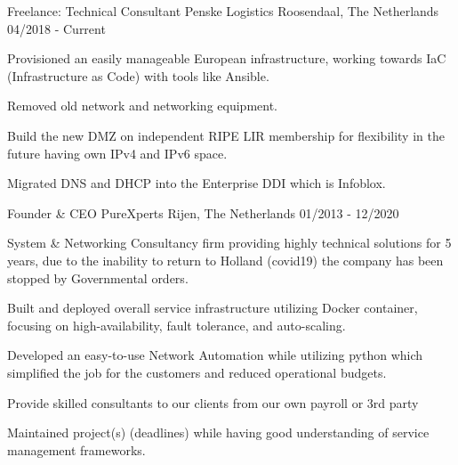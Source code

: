 

\begin{cventries}

\cventry
	{Freelance: Technical Consultant}  %
    {Penske Logistics} %
    {Roosendaal, The Netherlands} %
    {04/2018 - Current} %
    {
      \begin{cvitems} %
       \item {Provisioned an easily manageable European infrastructure, working towards IaC (Infrastructure as Code) with tools like Ansible.}
       \item {Removed old network and networking equipment.}
       \item {Build the new DMZ on independent RIPE LIR membership for flexibility in the future having own IPv4 and IPv6 space.}
       \item {Migrated DNS and DHCP into the Enterprise DDI which is Infoblox.}
       \end{cvitems}
	}
  \cventry
    {Founder \& CEO} %
    {PureXperts} %
    {Rijen, The Netherlands} %
    {01/2013 - 12/2020} %
    {
      \begin{cvitems} %
      \item {System \& Networking Consultancy firm providing highly technical solutions for 5 years, due to the inability to return to Holland (covid19) the company has been stopped by Governmental orders.}
        \item {Built and deployed overall service infrastructure utilizing Docker container, focusing on high-availability, fault tolerance, and auto-scaling.}
        \item {Developed an easy-to-use Network Automation while utilizing python which simplified the job for the customers and reduced operational budgets.}
	\item {Provide skilled consultants to our clients from our own payroll or 3rd party}
	\item {Maintained project(s) (deadlines) while having good understanding of service management frameworks.}

\end{cvitems}}
\end{cventries}
